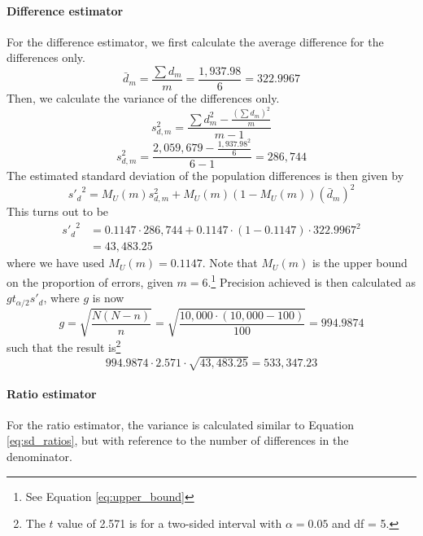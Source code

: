 \paragraph{Difference estimator} For the difference estimator, we first calculate the average difference for the differences only.
\begin{equation}
	\bar{d}_m = \frac{\sum{d_m}}{m} = \frac{1,937.98}{6} = 322.9967
	\label{eq:average_difference_m}
\end{equation}
Then, we calculate the variance of the differences only.
\begin{equation}
	s_{d, m}^2 = \frac{\sum{d_m^2} - \frac{(\sum{d_m})^2}{m}}{m - 1}	
	\label{eq:sd_diff_m}
\end{equation}
\begin{equation*}
	s_{d, m}^2 = \frac{2,059,679 - \frac{1,937.98^2}{6}}{6 - 1} = 286,744
\end{equation*}
The estimated standard deviation of the population differences is then given by
\begin{equation}
	{s'_d}^2 = M_U(m) s_{d, m}^2 + M_U(m)(1 - M_U(m))(\bar{d}_m)^2
\label{eq:sd_diff_sporadic}
\end{equation}
This turns out to be
\begin{align*}
	{s'_d}^2 &= 0.1147 \cdot 286,744 + 0.1147 \cdot (1 - 0.1147) \cdot 322.9967^2 \\
	&= 43,483.25
\end{align*}
where we have used $M_U(m) = 0.1147$. 
Note that $M_U(m)$ is the upper bound on the proportion of errors, given $m = 6$.\footnote{See Equation \ref{eq:upper_bound}}
Precision achieved is then calculated as $g t_{\alpha/2} s'_d$, where $g$ is now
\begin{equation*}
g = \sqrt{\frac{N(N - n)}{n}} = \sqrt{\frac{10,000 \cdot (10,000 - 100)}{100}} = 994.9874
\end{equation*}
such that the result is\footnote{The $t$ value of 2.571 is for a two-sided interval with $\alpha = 0.05$ and df = 5.}
\begin{equation*}
  994.9874 \cdot 2.571 \cdot \sqrt{43,483.25} = 533,347.23
\end{equation*}

\paragraph{Ratio estimator} For the ratio estimator, the variance is calculated similar to Equation \ref{eq:sd_ratios}, but with reference to the number of differences in the denominator.

